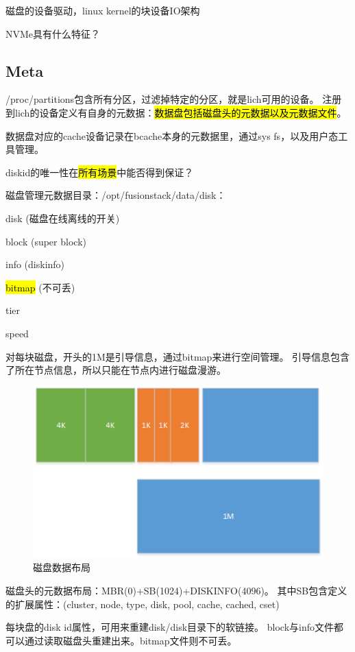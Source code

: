 磁盘的设备驱动，linux kernel的块设备IO架构

NVMe具有什么特征？

\subsection{Meta}

/proc/partitions包含所有分区，过滤掉特定的分区，就是lich可用的设备。
注册到lich的设备定义有自身的元数据：\hl{数据盘包括磁盘头的元数据以及元数据文件}。

数据盘对应的cache设备记录在bcache本身的元数据里，通过sys fs，以及用户态工具管理。

diskid的唯一性在\hl{所有场景}中能否得到保证？

磁盘管理元数据目录：/opt/fusionstack/data/disk：
\begin{compactitem}
\item disk (磁盘在线离线的开关)
\item block (super block)
\item info (diskinfo)
\item \hl{bitmap} (不可丢)
\item tier
\item speed
\end{compactitem}

对每块磁盘，开头的1M是引导信息，通过bitmap来进行空间管理。
引导信息包含了所在节点信息，所以只能在节点内进行磁盘漫游。

\begin{figure}[h]
    \centering
    \includegraphics{../images/disk_layout.png}
    \caption{磁盘数据布局}
\end{figure}

磁盘头的元数据布局：MBR(0)+SB(1024)+DISKINFO(4096)。
其中SB包含定义的扩展属性：(cluster, node, type, disk, pool, cache, cached, cset)

每块盘的disk id属性，可用来重建disk/disk目录下的软链接。
block与info文件都可以通过读取磁盘头重建出来。bitmap文件则不可丢。

